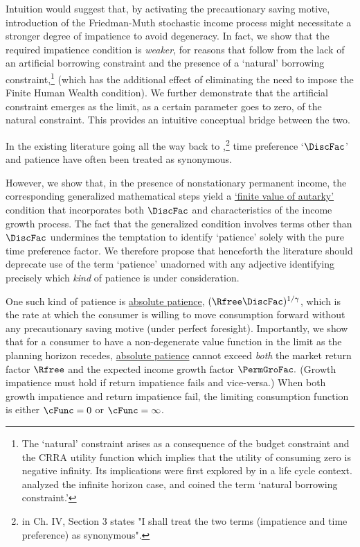 \documentclass[BufferStockTheory]{subfiles}
\begin{document}
Intuition would suggest that, by activating the precautionary saving motive, introduction of the Friedman-Muth stochastic income process might necessitate a stronger degree of impatience to avoid degeneracy. In fact, we show that the required impatience condition is \textit{weaker}, for reasons that follow from the lack of an artificial borrowing constraint and the presence of a `natural' borrowing constraint,\footnote{The `natural' constraint arises as a consequence of the budget constraint and the CRRA utility function which implies that the utility of consuming zero is negative infinity.  Its implications were first explored by \cite{zeldesStochastic} in a life cycle context. \cite{carroll:brookings} analyzed the infinite horizon case, and \cite{aiyagari:ge} coined the term `natural borrowing constraint.'} (which has the additional effect of eliminating the need to impose the Finite Human Wealth condition). We further demonstrate that the artificial constraint emerges as the limit, as a certain parameter goes to zero, of the natural constraint. This provides an intuitive conceptual bridge between the two.

In the existing literature going all the way back to \cite{fisherInterestTheory},\footnote{\cite{fisherInterestTheory} in Ch. IV, Section 3 states "I shall treat the two terms (impatience and time preference) as synonymous".} time preference `$\DiscFac$' and patience have often been treated as synonymous. %



However, we show that, in the presence of nonstationary permanent income, the corresponding generalized mathematical steps yield a \hyperlink{FVAC}{`finite value of autarky'} condition that incorporates both $\DiscFac$ and characteristics of the income growth process. The fact that the generalized condition involves terms other than $\DiscFac$ undermines the temptation to identify `patience' solely with the pure time preference factor.  We therefore propose that henceforth the literature should deprecate use of the term `patience' unadorned with any adjective identifying precisely which \textit{kind} of patience is under consideration.


One such kind of patience is \hyperlink{APFac}{absolute patience}, $\APFacRaw$, which is the rate at which the consumer is willing to move consumption forward without any precautionary saving motive (under perfect foresight). Importantly, we show that for a consumer to have a non-degenerate value function in the limit as the planning horizon recedes, \hyperlink{APFac}{absolute patience} cannot exceed \textit{both} the market return factor $\Rfree$ and the expected income growth factor $\PermGroFac.$
(Growth impatience must hold if return impatience fails and vice-versa.)
When both growth impatience and return impatience fail, the limiting consumption function is either $\cFunc=0$ or $\cFunc=\infty$. 
\end{document}
